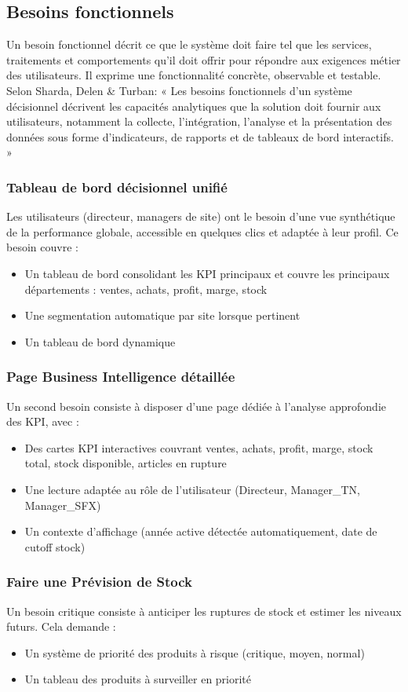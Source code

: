 \subsection{Besoins fonctionnels}
Un besoin fonctionnel décrit ce que le système doit faire tel que les services, traitements et comportements qu'il doit offrir pour répondre aux exigences métier des utilisateurs. Il exprime une fonctionnalité concrète, observable et testable.\\
Selon Sharda, Delen \& Turban: « Les besoins fonctionnels d'un système décisionnel décrivent les capacités analytiques que la solution doit fournir aux utilisateurs, notamment la collecte, l'intégration, l'analyse et la présentation des données sous forme d'indicateurs, de rapports et de tableaux de bord interactifs. » \cite{Sharda2024}
\subsubsection{Tableau de bord décisionnel unifié}
Les utilisateurs (directeur, managers de site) ont le besoin d'une vue synthétique de la performance globale, accessible en quelques clics et adaptée à leur profil. Ce besoin couvre :
\begin{itemize}
    \item Un tableau de bord consolidant les KPI principaux et couvre les principaux départements : ventes, achats, profit, marge, stock
    \item Une segmentation automatique par site lorsque pertinent
    \item Un tableau de bord dynamique
\end{itemize}
\subsubsection{Page Business Intelligence détaillée}
Un second besoin consiste à disposer d'une page dédiée à l'analyse approfondie des KPI, avec :
\begin{itemize}
    \item Des cartes KPI interactives couvrant ventes, achats, profit, marge, stock total, stock disponible, articles en rupture
    \item Une lecture adaptée au rôle de l'utilisateur (Directeur, Manager\_TN, Manager\_SFX)
    \item Un contexte d'affichage (année active détectée automatiquement, date de cutoff stock)
\end{itemize}
\subsubsection{Faire une Prévision de Stock }
Un besoin critique consiste à anticiper les ruptures de stock et estimer les niveaux futurs. Cela demande :
\begin{itemize}
    \item Un système de priorité des produits à risque (critique, moyen, normal)
    \item Un tableau des produits à surveiller en priorité
\end{itemize}
